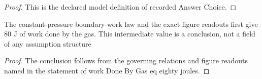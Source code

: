 \begin{proof}
  This is the declared model definition of recorded Answer Choice.
\end{proof}
\begin{lemma}
  \label{lem:physics:phyx-mini-0403:phyxminiproblems-problemphyxmini0403-workdonebygas-eq-eighty-joules}
  The constant-pressure boundary-work law and the exact figure readouts first give 80 J of work done by the gas. This intermediate value is a conclusion, not a field of any assumption structure
\end{lemma}
\begin{proof}
  The conclusion follows from the governing relations and figure readouts named in the statement of work Done By Gas eq eighty joules.
\end{proof}

